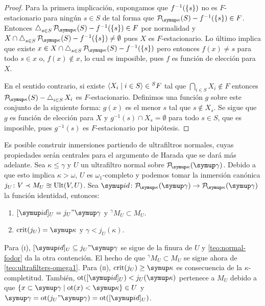 \begin{proof}
    Para la primera implicación, supongamos que $f^{-1}(\left\{ s \right\})$ no es $F$-estacionario
    para ningún $s\in S$ de tal forma que $\pwset[\kappa]{S}-f^{-1}(\set{s}) \in F$.
    Entonces $\dint_{s\in S}\pwset[\kappa]{S}-f^{-1}(\set{s})\in F$ por normalidad
    y $X\cap \dint_{s\in S}\pwset[\kappa]{S}-f^{-1}(\set{s})\neq\emptyset$
    pues $X$ es $F$-estacionario. Lo último implica que existe
    $x\in X\cap \dint_{s\in S}\pwset[\kappa]{S}-f^{-1}(\set{s})$
    pero entonces $f(x)\neq s$ para todo $s\in x$ o,
    $f(x)\notin x$, lo cual es imposible, pues $f$ es función de elección para $X$.

    En el sentido contrario, si existe $\langle X_i\mid i\in S \rangle\in {}^SF$ tal que
    $\dint_{i\in S} X_i \notin F$ entonces $\pwset[\kappa]{S} - \dint_{i\in S} X_i$
    es $F$-estacionario. Definimos una función $g$ sobre este conjunto de la siguiente
    forma: $g(x)$ es el menor $s$ tal que $s\notin X_s$. Se sigue que $g$ es función
    de elección para $X$ y $g^{-1}({s})\cap X_s=\emptyset$ para todo $s\in S$, que es
    imposible, pues $g^{-1}({s})$ es $F$-estacionario por hipótesis.
\end{proof}

Es posible construir inmersiones partiendo de ultrafiltros normales,
cuyas propiedades serán centrales para el argumento de Harada que se dará más adelante.
Sea $\kappa\leq\gamma$ y $U$ un ultrafiltro normal sobre $\pwset[\kappa]{\gamma}$.
Debido a que esto implica $\kappa > \omega$, $U$ es $\omega_1$-completo y podemos tomar
la inmersión canónica $j_U\colon V\prec M_U\approxeq\operatorname{Ult}(V,U)$.
Sea $\id\colon\pwset[\kappa]{\gamma}\to\pwset[\kappa]{\gamma}$ la función identidad, entonces:
\begin{enumerate}[label=(\roman*)]
    \item $[\id]_U = j_U"\gamma$ y ${}^\gamma M_U\subset M_U$.
    \item $\crit{j_U} = \kappa$ y $\gamma < j_U(\kappa)$.
\end{enumerate}

Para (\textsc{i}), $[\id]_U \subseteq j_U"\gamma$ se sigue de la finura de $U$ y
\ref{teo:normal-fodor} da la otra contención. El hecho de que ${}^\gamma M_U\subset M_U$
se sigue ahora de \ref{teo:ultrafilters-omega1}. Para (\textsc{ii}), $\crit{j_U}\geq\kappa$
es consecuencia de la $\kappa$-completitud. También, $\ot([\id]_U) < j_U(\kappa)$ pertenece
a $M_U$ debido a que $\set{x\subset\gamma\mid\ot(x)<\kappa}\in U$ y
$\gamma=\ot(j_U"\gamma)=\ot([\id]_U)$.

